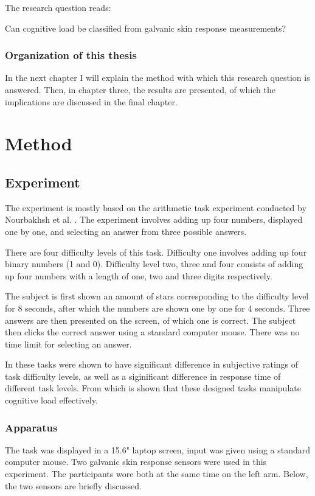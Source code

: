 \documentclass[11pt,leqno,a4paper]{report} %
\begin{document}
The research question reads:

\begin{center}
Can cognitive load be classified from galvanic skin response measurements?
\end{center}


\subsection{Organization of this thesis}
In the next chapter I will explain the method with which this research question is answered. Then, in chapter three, the results are presented, of which the implications are discussed in the final chapter.

\chapter{Method}

\section{Experiment}
The experiment is mostly based on the arithmetic task experiment conducted by Nourbakhsh et al. \citep{Nourbakhsh2012}. The experiment involves adding up four numbers, displayed one by one, and selecting an answer from three possible answers.

There are four difficulty levels of this task. Difficulty one involves adding up four binary numbers (1 and 0). Difficulty level two, three and four consists of adding up  four numbers with a length of one, two and three digits respectively.

The subject is first shown an amount of stars corresponding to the difficulty level for 8 seconds, after which the numbers are shown one by one for 4 seconds. Three answers are then presented on the screen, of which one is correct. The subject then clicks the correct answer using a standard computer mouse. There was no time limit for selecting an answer.

In \citep{Nourbakhsh2013} these tasks were shown to have significant difference in subjective ratings of task difficulty levels, as well as a siginificant difference in response time of different task levels. From which is shown that these designed tasks manipulate cognitive load effectively.


\subsection{Apparatus}
The task was displayed in a 15.6" laptop screen, input was given using a standard computer mouse.
Two galvanic skin response sensors were used in this experiment. The participants wore both at the same time on the left arm. Below, the two sensors are briefly discussed.
\end{document}
